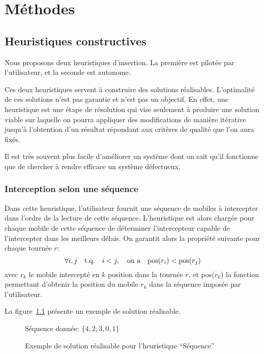 \chapter{Méthodes}
    \section{Heuristiques constructives}
		Nous proposons deux heuristiques d'insertion. La première est pilotée par l'utilisateur, et la seconde est autonome.

		Ces deux heuristiques servent à construire des solutions réalisables. L'optimalité de ces solutions n'est pas garantie et n'est pas un objectif. En effet, une heuristique est une étape de résolution qui vise seulement à produire une solution viable sur laquelle on pourra appliquer des modifications de manière itérative jusqu'à l'obtention d'un résultat répondant aux critères de qualité que l'on aura fixés.

		Il est très souvent plus facile d'améliorer un système dont on sait qu'il fonctionne que de chercher à rendre efficace un système défectueux.
		\subsection{Interception selon une séquence}
		\label{sub:heuristic_sequence}
			Dans cette heuristique, l'utilisateur fournit une séquence de mobiles à intercepter dans l'ordre de la lecture de cette séquence. L'heuristique est alors chargée pour chaque mobile de cette séquence de déterminer l'intercepteur capable de l'intercepter dans les meilleurs délais. On garantit alors la propriété suivante pour chaque tournée $r$:
			\[
				\forall i, j \qtext{t.q.}  i<j, \qtext{on a} \text{pos}(r_i) < \text{pos}(r_j)
			\]
			avec $r_k$ le mobile intercepté en $k$\ieme{} position dans la tournée $r$, et pos($r_k$) la fonction permettant d'obtenir la position du mobile $r_k$ dans la séquence imposée par l'utilisateur.

			La figure~\ref{fig:heuristic_sequence_demo} présente un exemple de solution réalisable.

			\begin{figure}[h!]
			\centering
			Séquence donnée: $\{4, 2, 3, 0, 1\}$

			\begin{tikzpicture}[schema]
				
			\end{tikzpicture}
			\caption{Exemple de solution réalisable pour l'heuristique ``Séquence''}
			\label{fig:heuristic_sequence_demo}
			\end{figure}

